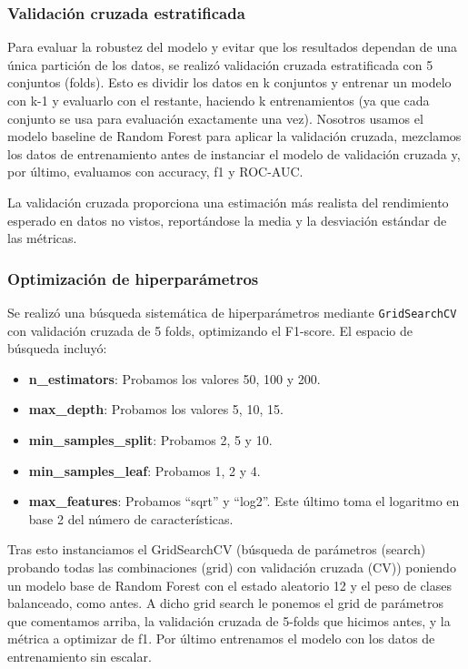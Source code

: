 \subsubsection*{Validación cruzada estratificada}

Para evaluar la robustez del modelo y evitar que los resultados dependan de una única partición de los datos, se realizó validación cruzada estratificada con 5 conjuntos (folds). Esto es dividir los datos en k conjuntos y entrenar un modelo con k-1 y evaluarlo con el restante, haciendo k entrenamientos (ya que cada conjunto se usa para evaluación exactamente una vez). Nosotros usamos el modelo baseline de Random Forest para aplicar la validación cruzada, mezclamos los datos de entrenamiento antes de instanciar el modelo de validación cruzada y, por último, evaluamos con accuracy, f1 y ROC-AUC.

La validación cruzada proporciona una estimación más realista del rendimiento esperado en datos no vistos, reportándose la media y la desviación estándar de las métricas.

\subsubsection*{Optimización de hiperparámetros}

Se realizó una búsqueda sistemática de hiperparámetros mediante \texttt{GridSearchCV} con validación cruzada de 5 folds, optimizando el F1-score. El espacio de búsqueda incluyó:

\begin{itemize}
	\item \textbf{n\_estimators}: Probamos los valores 50, 100 y 200.
	\item \textbf{max\_depth}: Probamos los valores 5, 10, 15.
	\item \textbf{min\_samples\_split}: Probamos 2, 5 y 10.
	\item \textbf{min\_samples\_leaf}: Probamos 1, 2 y 4.
	\item \textbf{max\_features}: Probamos ``sqrt'' y ``log2''. Este último toma el logaritmo en base 2 del número de características.
\end{itemize}

Tras esto instanciamos el GridSearchCV (búsqueda de parámetros (search) probando todas las combinaciones (grid) con validación cruzada (CV)) poniendo un modelo base de Random Forest con el estado aleatorio 12 y el peso de clases balanceado, como antes. A dicho grid search le ponemos el grid de parámetros que comentamos arriba, la validación cruzada de 5-folds que hicimos antes, y la métrica a optimizar de f1. Por último entrenamos el modelo con los datos de entrenamiento sin escalar.